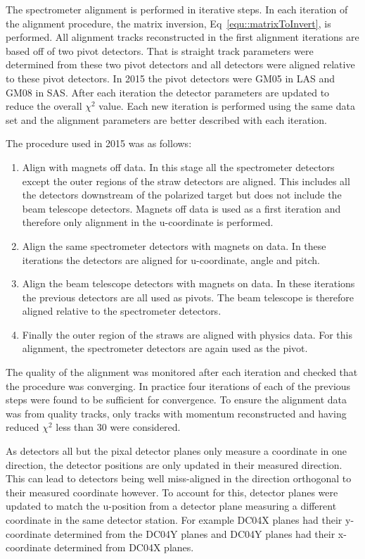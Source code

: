 The spectrometer alignment is performed in iterative steps.  In each iteration
of the alignment procedure, the matrix inversion, Eq~\ref{equ::matrixToInvert},
is performed.  All alignment tracks reconstructed in the first alignment
iterations are based off of two pivot detectors.  That is straight track
parameters were determined from these two pivot detectors and all detectors were
aligned relative to these pivot detectors.  In 2015 the pivot detectors were
GM05 in LAS and GM08 in SAS.  After each iteration the detector parameters are
updated to reduce the overall $\chi^2$ value.  Each new iteration is performed
using the same data set and the alignment parameters are better described with
each iteration.

The procedure used in 2015 was as follows:
\begin{enumerate}
\item Align with magnets off data.  In this stage all the spectrometer detectors
  except the outer regions of the straw detectors are aligned.  This includes
  all the detectors downstream of the polarized target but does not include the
  beam telescope detectors.  Magnets off data is used as a first iteration and
  therefore only alignment in the u-coordinate is performed.
\item Align the same spectrometer detectors with magnets on data.  In these
  iterations the detectors are aligned for u-coordinate, angle and pitch.
\item Align the beam telescope detectors with magnets on data.  In these
  iterations the previous detectors are all used as pivots.  The beam telescope
  is therefore aligned relative to the spectrometer detectors.
\item Finally the outer region of the straws are aligned with physics data.  For
  this alignment, the spectrometer detectors are again used as the pivot.
\end{enumerate}

The quality of the alignment was monitored after each iteration and checked that
the procedure was converging.  In practice four iterations of each of the
previous steps were found to be sufficient for convergence.  To ensure the
alignment data was from quality tracks, only tracks with momentum reconstructed
and having reduced $\chi^2$ less than 30 were considered.

As detectors all but the pixal detector planes only measure a coordinate in one
direction, the detector positions are only updated in their measured direction.
This can lead to detectors being well miss-aligned in the direction orthogonal
to their measured coordinate however.  To account for this, detector planes were
updated to match the u-position from a detector plane measuring a different
coordinate in the same detector station.  For example DC04X planes had their
y-coordinate determined from the DC04Y planes and DC04Y planes had their
x-coordinate determined from DC04X planes.

